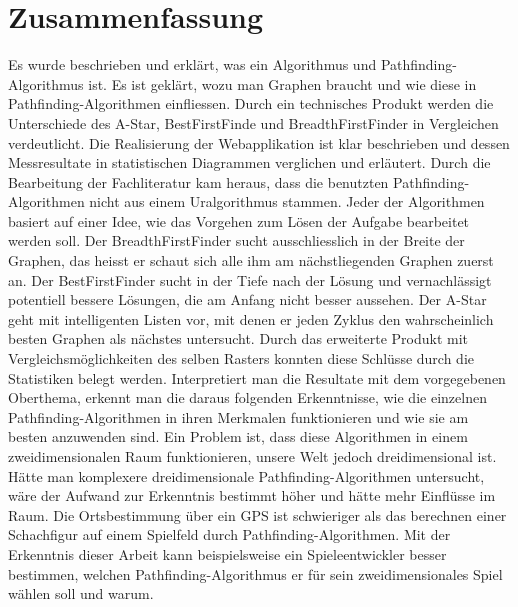 \section{Zusammenfassung}
Es wurde beschrieben und erklärt, was ein Algorithmus und Pathfinding-Algorithmus ist. Es ist geklärt, wozu man Graphen braucht und wie diese in Pathfinding-Algorithmen einfliessen. Durch ein technisches Produkt werden die Unterschiede des A-Star, BestFirstFinde und BreadthFirstFinder in Vergleichen verdeutlicht. Die Realisierung der Webapplikation ist klar beschrieben und dessen Messresultate in statistischen Diagrammen verglichen und erläutert. Durch die Bearbeitung der Fachliteratur kam heraus, dass die benutzten Pathfinding-Algorithmen nicht aus einem Uralgorithmus stammen. Jeder der Algorithmen basiert auf einer Idee, wie das Vorgehen zum Lösen der Aufgabe bearbeitet werden soll. Der BreadthFirstFinder sucht ausschliesslich in der Breite der Graphen, das heisst er schaut sich alle ihm am nächstliegenden Graphen zuerst an. Der BestFirstFinder sucht in der Tiefe nach der Lösung und vernachlässigt potentiell bessere Lösungen, die am Anfang nicht besser aussehen. Der A-Star geht mit intelligenten Listen vor, mit denen er jeden Zyklus den wahrscheinlich besten Graphen als nächstes untersucht. Durch das erweiterte Produkt mit Vergleichsmöglichkeiten des selben Rasters konnten diese Schlüsse durch die Statistiken belegt werden. Interpretiert man die Resultate mit dem vorgegebenen Oberthema, erkennt man die daraus folgenden Erkenntnisse, wie die einzelnen Pathfinding-Algorithmen in ihren Merkmalen funktionieren und wie sie am besten anzuwenden sind. Ein Problem ist, dass diese Algorithmen in einem zweidimensionalen Raum funktionieren, unsere Welt jedoch dreidimensional ist. Hätte man komplexere dreidimensionale Pathfinding-Algorithmen untersucht, wäre der Aufwand zur Erkenntnis bestimmt höher und hätte mehr Einflüsse im Raum. Die Ortsbestimmung über ein GPS ist schwieriger als das berechnen einer Schachfigur auf einem Spielfeld durch Pathfinding-Algorithmen. Mit der Erkenntnis dieser Arbeit kann beispielsweise ein Spieleentwickler besser bestimmen, welchen Pathfinding-Algorithmus er für sein zweidimensionales Spiel wählen soll und warum.
